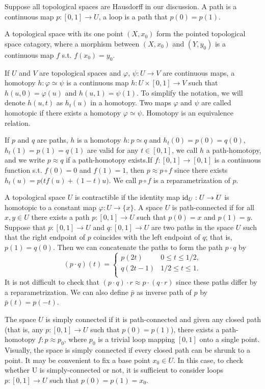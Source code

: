 \documentclass[10pt]{article}
\theoremstyle{plain}
\begin{document}
Suppose all topological spaces are Hausdorff in our discussion. A path is a continuous map $p:[0,1]\to U$, a loop is a path that $p(0)=p(1)$.

A topological space with its one point $(X,x_0)$ form the pointed topological space catagory, where a morphism between $(X,x_0)$ and $(Y,y_0)$ is a continuous map $f$ s.t. $f(x_0)=y_0$.

If $U$ and $V$ are topological spaces and $\varphi$, $\psi:U\to V$ are continuous maps, a homotopy $h : \varphi \simeq\psi$ is a continuous map $h : U \times [0,1] \to V$ such that $h(u,0) = \varphi(u)$ and $h(u,1) = \psi(1)$. To simplify the notation, we will denote
$h(u, t)$ as $h_t(u)$ in a homotopy. Two maps $\varphi$ and $\psi$ are called homotopic if there exists a homotopy $\varphi \simeq\psi$. Homotopy is an equivalence relation.

If $p$ and $q$ are paths, $h$ is a homotopy $h: p \simeq q$ and $h_t(0)=p(0)=q(0)$, $h_t(1)=p(1)=q(1)$ are valid for any $t\in[0,1]$, we call $h$ a path-homotopy, and we write $p \approx q$ if a path-homotopy exists.If $f:[0,1]\to[0,1]$ is a continuous function s.t. $f(0)=0$ and $f(1)=1$, then $p\approx p\circ f$ since there exists $h_t(u)=p\bigl(tf(u)+(1-t)u\bigr)$. We call $p\circ f$ is a reparametrization of $p$.

A topological space $U$ is contractible if the identity map $\operatorname{id}_U:U\to U$ is homotopic to a constant map $\varphi:U\to \{x\}$. A space
$U$ is path-connected if for all $x, y \in U$ there exists a path $p : [0,1] \to U$ such that $p(0) = x$ and $p(1) = y$.
Suppose that $p : [0,1] \to U$ and $q : [0,1] \to U$ are two paths in the space $U$ such that the right endpoint of $p$ coincides with the left endpoint of $q$; that is, $p(1) = q(0)$. Then we can concatenate the paths to form the path $p\cdot q$ by
\[
	(p\cdot q)(t)=
	\begin{cases}
		p(2t) &0 \leq t\leq 1/2,\\
		q(2t-1)&1/2 \leq t\leq 1.\\
	\end{cases}
\]
It is not difficult to check that $(p\cdot q)\cdot r \approx p\cdot (q\cdot r)$ since these paths differ by a reparametrization. We can also define $\bar{p}$ as inverse path of $p$ by $\bar{p}(t)=p(-t)$.

The space $U$ is simply connected if it is path-connected and given any
closed path (that is, any $p : [0,1] \to U$ such that $p(0) = p(1)$), there exists a path-homotopy $f : p \approx p_0$, where $p_0$ is a trivial loop mapping $[0,1]$ onto a single point. Visually, the space is simply connected if every closed path can be shrunk to a point. It may be convenient to fix a base point $x_0 \in U$. In this case, to check whether U is simply-connected or not, it is sufficient to consider
loops $p : [0,1] \to U$ such that $p(0) = p(1) = x_0$.
\end{document}
